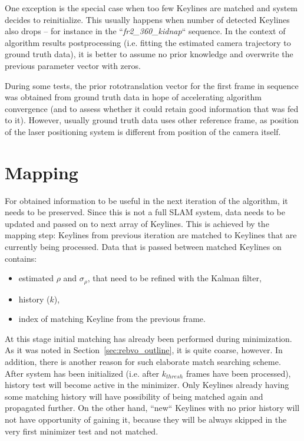 One exception is the special case when too few Keylines are matched and system decides to reinitialize. This usually happens when number of detected Keylines also drops -- for instance in the ``\textit{fr2\_360\_kidnap}`` sequence. In the context of algorithm results postprocessing (i.e. fitting the estimated camera trajectory to ground truth data), it is better to assume no prior knowledge and overwrite the previous parameter vector with zeros.

During some tests, the prior rototranslation vector for the first frame in sequence was obtained from ground truth data in hope of accelerating algorithm convergence (and to assess whether it could retain good information that was fed to it). However, usually ground truth data uses other reference frame, as position of the laser positioning system is different from position of the camera itself.


\section{Mapping}

For obtained information to be useful in the next iteration of the algorithm, it needs to be preserved. Since this is not a full SLAM system, data needs to be updated and passed on to next array of Keylines. This is achieved by the mapping step: Keylines from previous iteration are matched to Keylines that are currently being processed. Data that is passed between matched Keylines on contains:

\begin{itemize}
	\item estimated $\rho$ and $\sigma_{\rho}$, that need to be refined with the Kalman filter,
	\item history ($k$),
	\item index of matching Keyline from the previous frame.
\end{itemize}

At this stage initial matching has already been performed during minimization. As it was noted in Section~\ref{sec:rebvo_outline}, it is quite coarse, however. In addition, there is another reason for such elaborate match searching scheme. After system has been initialized (i.e. after $k_{thresh}$ frames have been processed), history test will become active in the minimizer. Only Keylines already having some matching history will have possibility of being matched again and propagated further. On the other hand, ``new`` Keylines with no prior history will not have opportunity of gaining it, because they will be always skipped in the very first minimizer test and not matched.

